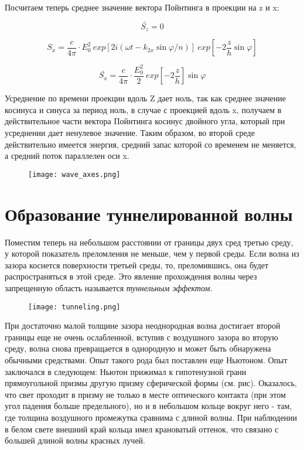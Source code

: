 	Посчитаем теперь среднее значение вектора Пойнтинга в проекции на z и x:
	
	\[\bar{S_{z}} = 0 \]
	
		\[S_{x} = \frac{c}{4 \pi } \cdot E_{0}^{2} \ exp[2 i (\omega t - k_{2x} \sin{\varphi} / n) ]  \ exp[- 2 \frac{z}{h} \sin{\varphi}]\]
		
		\[  \bar{S_{x}} =  \frac{c}{4 \pi } \cdot \frac{E_{0}^{2}}{2}   \ exp[- 2 \frac{z}{h}] \sin{\varphi}  \]
		
		Усреднение по времени проекции вдоль Z дает ноль, так как среднее значение косинуса и синуса за период ноль, в случае с проекцией вдоль x, получаем в действительное части вектора Пойнтинга косинус двойного угла, который при усреднении дает ненулевое значение. Таким образом, во второй среде действительно имеется энергия, средний запас которой со временем не меняется, а средний поток параллелен оси x.
		
		\begin{figure}[h]
			\centering
			\texttt{[image: wave\_axes.png]}
		\end{figure}
	
	
	\section{Образование туннелированной волны}
	
	Поместим теперь на небольшом расстоянии от границы двух сред третью среду, у которой показатель преломления не меньше, чем у первой среды. Если волна из зазора коснется поверхности третьей среды, то, преломившись, она будет распространяться в этой среде. Это явление прохождения волны через запрещенную область называется \textit{туннельным эффектом}.
	
	\begin{figure}[h]
		\centering
		\texttt{[image: tunneling.png]}
	\end{figure}
	
	При  достаточно малой толщине зазора  неоднородная волна достигает второй границы еще не очень ослабленной, вступив с воздушного зазора во вторую среду, волна снова превращается в однородную и может быть обнаружена обычными средствами. Опыт такого рода был поставлен еще Ньютоном. Опыт заключался в следующем: Ньютон прижимал к гипотенузной грани прямоугольной призмы другую призму сферической формы (см. рис). Оказалось, что свет проходит в призму не только в месте оптического контакта (при этом угол падения больше предельного), но и в небольшом кольце вокруг него -  там, где толщина воздушного промежутка сравнима с длиной волны. При наблюдении в белом свете внешний край кольца имел крановатый оттенок, что связано с большей длиной волны красных лучей.
	

